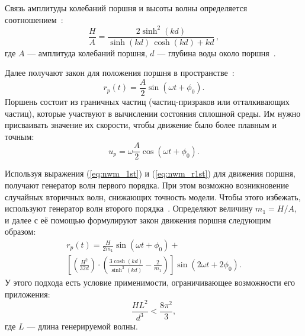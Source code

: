 Связь амплитуды колебаний поршня и высоты волны определяется соотношением~\cite{Altomare2017}:
\begin{equation}\label{eq:nwm_1st}
    \frac{H}{A} = \frac{2\sinh^{2}(kd)}{\sinh(kd)\,\cosh(kd) + kd}\,,
\end{equation}
%
где $A$ --- амплитуда колебаний поршня, $d$ --- глубина воды около поршня~\cite{Monaghan1994}.

Далее получают закон для положения поршня в пространстве~\cite{Altomare2017}:
\begin{equation}\label{eq:nwm_r1st}
    r_{p}(t) = \frac{A}{2}\sin(\omega t + \phi_{0}).
\end{equation}
%
Поршень состоит из граничных частиц (частиц-призраков или отталкивающих частиц), которые участвуют в вычислении состояния сплошной среды. 
Им нужно присваивать значение их скорости, чтобы движение было более плавным и точным\cite{Lu2021}:
\begin{equation}
    u_{p} = \omega \frac{A}{2}\cos(\omega t + \phi_{0}).
\end{equation}

Используя выражения (\ref{eq:nwm_1st}) и (\ref{eq:nwm_r1st}) для движения поршня,
получают генератор волн первого порядка.
%
При этом возможно возникновение случайных вторичных волн, снижающих точность модели.
%
Чтобы этого избежать, используют генератор волн второго порядка~\cite{Madsen1971}.
%
Определяют величину $m_{1} = H/A$, и далее с её помощью формулируют закон движения поршня следующим образом:
%
\begin{multline}\label{eq:nwm_2nd}
    r_{p}(t) = \frac{H}{2m_{1}} \sin(\omega t + \phi_{0}) +
    \\
    \left[
        \left( \frac{H^{2}}{32d} \right) 
        \cdot
        \left( \frac{3\cosh(kd)}{\sinh^{3}(kd)} - \frac{2}{m_{1}} \right)
    \right]
    \sin(2\omega t + 2 \phi_{0}).
\end{multline}
%
У этого подхода есть условие применимости, ограничивающее возможности его приложения:
%
\begin{equation}
    \frac{HL^2}{d^3} < \frac{8\pi^{2}}{3},
\end{equation}
%
где $L$ --- длина генерируемой волны.


